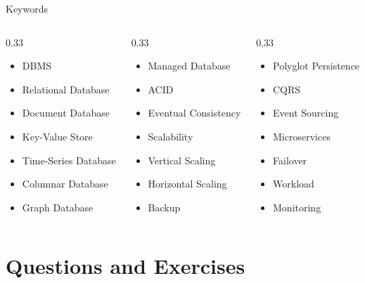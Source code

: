 \documentclass[aspectratio=169,11pt]{beamer}
\newcommand{\smallitem}{\setlength{\itemsep}{2pt}\setlength{\parskip}{0pt}}
\begin{document}
\begin{frame}{Keywords}
\small
\begin{columns}[T]
\begin{column}{0.33\textwidth}
\begin{itemize}
  \smallitem
  \item DBMS
  \item Relational Database
  \item Document Database
  \item Key-Value Store
  \item Time-Series Database
  \item Columnar Database
  \item Graph Database
\end{itemize}
\end{column}
\begin{column}{0.33\textwidth}
\begin{itemize}
  \smallitem
  \item Managed Database
  \item ACID
  \item Eventual Consistency
  \item Scalability
  \item Vertical Scaling
  \item Horizontal Scaling
  \item Backup
\end{itemize}
\end{column}
\begin{column}{0.33\textwidth}
\begin{itemize}
  \smallitem
  \item Polyglot Persistence
  \item CQRS
  \item Event Sourcing
  \item Microservices
  \item Failover
  \item Workload
  \item Monitoring
\end{itemize}
\end{column}
\end{columns}
\end{frame}

\section{Questions and Exercises}
\end{document}
